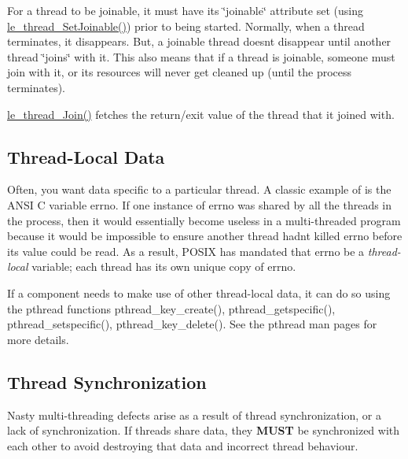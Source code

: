 For a thread to be joinable, it must have its \char`\"{}joinable\char`\"{} attribute set (using \hyperlink{le__thread_8h_a8959f09f66f365916a6a4fbdaf36cf65}{le\+\_\+thread\+\_\+\+Set\+Joinable()}) prior to being started. Normally, when a thread terminates, it disappears. But, a joinable thread doesn\textquotesingle{}t disappear until another thread \char`\"{}joins\char`\"{} with it. This also means that if a thread is joinable, someone must join with it, or its resources will never get cleaned up (until the process terminates).

\hyperlink{le__thread_8h_adf7f24fec4859ca12a52b16ce43fd9b8}{le\+\_\+thread\+\_\+\+Join()} fetches the return/exit value of the thread that it joined with.\hypertarget{c_threading_threadLocalData}{}\subsection{Thread-\/\+Local Data}\label{c_threading_threadLocalData}
Often, you want data specific to a particular thread. A classic example of is the A\+N\+S\+I C variable {\ttfamily errno}. If one instance of {\ttfamily errno} was shared by all the threads in the process, then it would essentially become useless in a multi-\/threaded program because it would be impossible to ensure another thread hadn\textquotesingle{}t killed {\ttfamily errno} before its value could be read. As a result, P\+O\+S\+I\+X has mandated that {\ttfamily errno} be a {\itshape thread-\/local} variable; each thread has its own unique copy of {\ttfamily errno}.

If a component needs to make use of other thread-\/local data, it can do so using the pthread functions pthread\+\_\+key\+\_\+create(), pthread\+\_\+getspecific(), pthread\+\_\+setspecific(), pthread\+\_\+key\+\_\+delete(). See the pthread man pages for more details.\hypertarget{c_threading_threadSynchronization}{}\subsection{Thread Synchronization}\label{c_threading_threadSynchronization}
Nasty multi-\/threading defects arise as a result of thread synchronization, or a lack of synchronization. If threads share data, they {\bfseries M\+U\+S\+T} be synchronized with each other to avoid destroying that data and incorrect thread behaviour.

